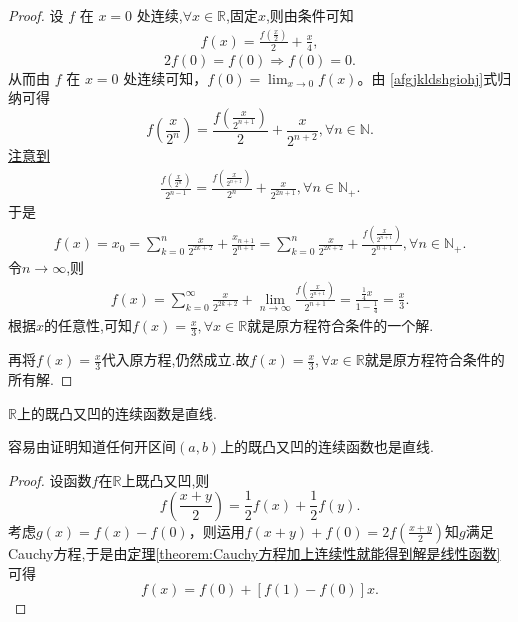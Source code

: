 \documentclass[../../main.tex]{subfiles}%
\begin{document}
\begin{proof}

设 \(f\) 在 \(x = 0\) 处连续,$\forall x\in \mathbb{R}$,固定$x$,则由条件可知
\begin{align}
f(x)=\frac{f\left(\frac{x}{2}\right)}{2}+\frac{x}{4}, \label{afgjkldshgiohj}
\end{align}
\[
2f(0)=f(0)\Rightarrow f(0)=0.
\]
从而由 \(f\) 在 \(x = 0\) 处连续可知，\(f(0)=\lim_{x\rightarrow 0}f(x)\)。由 \eqref{afgjkldshgiohj}式归纳可得
\[
f\left(\frac{x}{2^n}\right)=\frac{f\left(\frac{x}{2^{n + 1}}\right)}{2}+\frac{x}{2^{n + 2}},\forall n\in \mathbb{N}.
\]
\hyperlink{注意到的原因见笔记部分123}{注意到}
\begin{align*}
\frac{f\left( \frac{x}{2^n} \right)}{2^{n-1}}=\frac{f\left( \frac{x}{2^{n+1}} \right)}{2^n}+\frac{x}{2^{2n+1}},\forall n\in \mathbb{N} _+.
\end{align*}
于是
\begin{align*}
f\left( x \right) =x_0=\sum_{k=0}^n{\frac{x}{2^{2k+2}}}+\frac{x_{n+1}}{2^{n+1}}=\sum_{k=0}^n{\frac{x}{2^{2k+2}}}+\frac{f\left( \frac{x}{2^{n+1}} \right)}{2^{n+1}},\forall n\in \mathbb{N} _+.
\end{align*}
令$n\rightarrow \infty$,则
\begin{align*}
f\left( x \right) =\sum_{k=0}^{\infty}{\frac{x}{2^{2k+2}}}+\underset{n\rightarrow \infty}{\lim}\frac{f\left( \frac{x}{2^{n+1}} \right)}{2^{n+1}}=\frac{\frac{1}{4}x}{1-\frac{1}{4}}=\frac{x}{3}.
\end{align*}
根据$x$的任意性,可知$f(x)=\frac{x}{3},\forall x\in \mathbb{R}$就是原方程符合条件的一个解.

再将$f(x)=\frac{x}{3}$代入原方程,仍然成立.故$f(x)=\frac{x}{3},\forall x\in \mathbb{R}$就是原方程符合条件的所有解.

\end{proof}

\begin{proposition}\label{proposition:R上的既凸又凹的连续函数是直线}
\(\mathbb{R}\)上的既凸又凹的连续函数是直线.
\end{proposition}
\begin{note}
容易由证明知道任何开区间\((a,b)\)上的既凸又凹的连续函数也是直线.
\end{note}
\begin{proof}

设函数$f$在$\mathbb{R}$上既凸又凹,则
\[
f\left(\frac{x + y}{2}\right)=\frac{1}{2}f(x)+\frac{1}{2}f(y).
\]
考虑\(g(x)=f(x)-f(0)\)，则运用\(f(x + y)+f(0)=2f\left(\frac{x + y}{2}\right)\)知\(g\)满足Cauchy方程,于是由\hyperref[theorem:Cauchy方程加上连续性就能得到解是线性函数]{定理\ref{theorem:Cauchy方程加上连续性就能得到解是线性函数}}可得
\[
f(x)=f(0)+[f(1)-f(0)]x.
\]

\end{proof}
\end{document}
